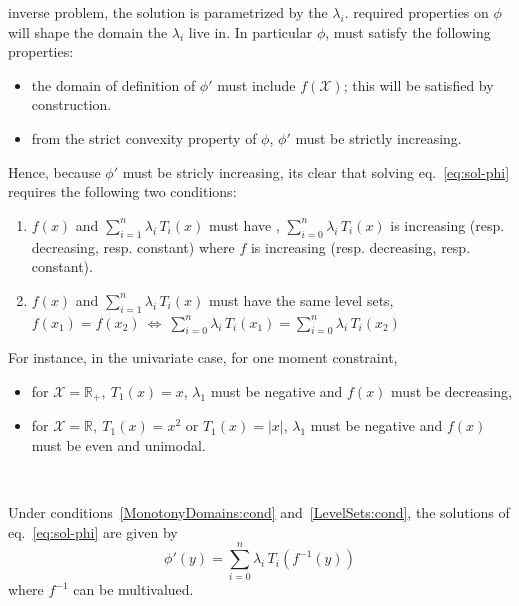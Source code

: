 \documentclass[english,sort&compress]{elsarticle}
\theoremstyle{definition}
\theoremstyle{plain}
\theoremstyle{plain}
\def\Rset{\mathbb{R}}
\def\X{\mathcal{X}}
\begin{document}
 inverse  problem, the solution is
parametrized by  the $\lambda_i$.  required properties  on $\phi$ will
shape the domain the $\lambda_i$ live in. In particular $\phi$, must satisfy the
following properties:
%
\begin{itemize}
\item the  domain of definition  of $\phi'$ must  include $f(\X)$; this  will be
  satisfied by construction.
%
\item from  the strict  convexity property of  $\phi$, $\phi'$ must  be strictly
  increasing.
\end{itemize}
%
Hence,  because $\phi'$  must  be  stricly increasing,  its  clear that  solving
eq.~\eqref{eq:sol-phi}  requires the following two conditions:
%
\begin{enumerate}[label=(C\arabic*)]
\item\label{MonotonyDomains:cond}   $f(x)$   and   $\displaystyle   \sum_{i=1}^n
  \lambda_i  \,  T_i(x)$  must  have ,  $\displaystyle
  \sum_{i=0}^n   \lambda_i  \,   T_i(x)$  is   increasing   (resp.  decreasing,
  resp. constant) where $f$ is increasing (resp. decreasing, resp. constant).
%
\item\label{LevelSets:cond} $f(x)$ and  $\displaystyle \sum_{i=1}^n \lambda_i \,
  T_i(x)$ must have the same level  sets, $f(x_1) = f(x_2) \: \Leftrightarrow \:
  \displaystyle \sum_{i=0}^n  \lambda_i \, T_i(x_1) =  \sum_{i=0}^n \lambda_i \,
  T_i(x_2)$
\end{enumerate}
%
For instance, in the univariate case, for one moment constraint, %
%
\begin{itemize}
\item for $\X = \Rset_+, \: T_1(x) = x$, $\lambda_1$ must be negative and $f(x)$
  must be decreasing,
%
\item for $\X = \Rset, \: T_1(x) = x^2$ or $T_1(x) = |x|$, $\lambda_1$ must be
  negative and $f(x)$ must be even and unimodal.
\end{itemize}

\

Under  conditions~\ref{MonotonyDomains:cond} and~\ref{LevelSets:cond}, the
solutions of eq.~\eqref{eq:sol-phi} are given by
%
\begin{equation}\label{eq:derivative-phi}
\phi'(y) = \sum_{i=0}^n \lambda_i \, T_i\!\left(f^{-1}(y)\right)
\end{equation}
%
where $f^{-1}$ can be multivalued.
\end{document}
